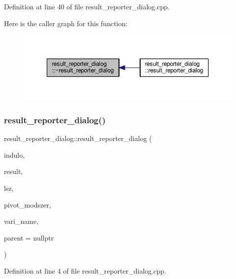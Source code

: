 Definition at line 40 of file result\+\_\+reporter\+\_\+dialog.\+cpp.

Here is the caller graph for this function\+:\nopagebreak
\begin{figure}[H]
\begin{center}
\leavevmode
\includegraphics[width=350pt]{classresult__reporter__dialog_a1d44819c105ea7c09e87d73247cf0efc_icgraph}
\end{center}
\end{figure}
\mbox{\label{classresult__reporter__dialog_a2edb2abb1360433138892c9fc2236506}} 
\subsubsection{\texorpdfstring{result\+\_\+reporter\+\_\+dialog()}{result\_reporter\_dialog()}\hspace{0.1cm}{\footnotesize\ttfamily [2/2]}}
{\footnotesize\ttfamily result\+\_\+reporter\+\_\+dialog\+::result\+\_\+reporter\+\_\+dialog (\begin{DoxyParamCaption}\item[{Q\+Standard\+Item\+Model $\ast$}]{indulo,  }\item[{Q\+Standard\+Item\+Model $\ast$}]{result,  }\item[{int}]{lsz,  }\item[{const Q\+String \&}]{pivot\+\_\+modszer,  }\item[{const Q\+String \&}]{vari\+\_\+name,  }\item[{Q\+Widget $\ast$}]{parent = {\ttfamily nullptr} }\end{DoxyParamCaption})\hspace{0.3cm}{\ttfamily [explicit]}}



Definition at line 4 of file result\+\_\+reporter\+\_\+dialog.\+cpp.

